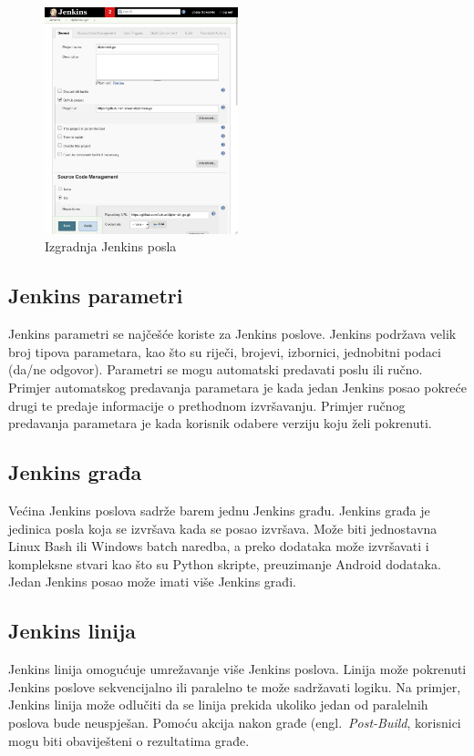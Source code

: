 \begin{figure}
    \centering
    \includegraphics[width=0.5\textwidth]{img/02/jenkins_job.png}
    \caption{Izgradnja Jenkins posla}%
    \label{fig:02jenkinsjob}
\end{figure}

\subsection{Jenkins parametri}
Jenkins parametri se najčešće koriste za Jenkins poslove. Jenkins podržava velik broj tipova
parametara, kao što su riječi, brojevi, izbornici, jednobitni podaci (da/ne odgovor). Parametri se
mogu automatski predavati poslu ili ručno. Primjer automatskog predavanja parametara je kada jedan
Jenkins posao pokreće drugi te predaje informacije o prethodnom izvršavanju. Primjer ručnog
predavanja parametara je kada korisnik odabere verziju koju želi pokrenuti.

\subsection{Jenkins građa}
Većina Jenkins poslova sadrže barem jednu Jenkins građu. Jenkins građa je jedinica posla koja se
izvršava kada se posao izvršava. Može biti jednostavna Linux Bash ili Windows batch naredba, a preko
dodataka može izvršavati i kompleksne stvari kao što su Python skripte, preuzimanje Android
dodataka. Jedan Jenkins posao može imati više Jenkins građi.

\subsection{Jenkins linija}
Jenkins linija omogućuje umrežavanje više Jenkins poslova. Linija može pokrenuti Jenkins poslove
sekvencijalno ili paralelno te može sadržavati logiku. Na primjer, Jenkins linija može odlučiti da
se linija prekida ukoliko jedan od paralelnih poslova bude neuspješan. Pomoću akcija nakon građe
(engl.~\textit{Post-Build}, korisnici mogu biti obaviješteni o rezultatima građe.

